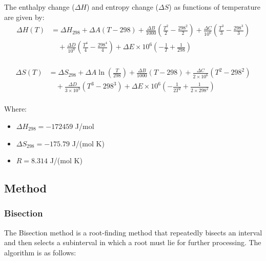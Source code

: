 \documentclass[10pt]{article}
\begin{document}
The enthalpy change (\( \Delta H \)) and entropy change (\( \Delta S \)) as functions of temperature are given by:
\begin{equation}
\begin{aligned}
\Delta H(T) &= \Delta H_{298} + \Delta A (T - 298) + \frac{\Delta B}{1000} \left( \frac{T^2}{2} - \frac{298^2}{2} \right) + \frac{\Delta C}{10^6} \left( \frac{T^3}{3} - \frac{298^3}{3} \right) \\
&\quad + \frac{\Delta D}{10^9} \left( \frac{T^4}{4} - \frac{298^4}{4} \right) + \Delta E \times 10^6 \left( -\frac{1}{T} + \frac{1}{298} \right) \\
\end{aligned}
\end{equation}

\begin{equation}
\begin{aligned}
\Delta S(T) &= \Delta S_{298} + \Delta A \ln \left( \frac{T}{298} \right) + \frac{\Delta B}{1000} (T - 298) + \frac{\Delta C}{2 \times 10^6} (T^2 - 298^2) \\
&\quad + \frac{\Delta D}{3 \times 10^9} (T^3 - 298^3) + \Delta E \times 10^6 \left( -\frac{1}{2T^2} + \frac{1}{2 \times 298^2} \right) \\
\end{aligned}
\end{equation}

Where:
\begin{itemize}
    \item \( \Delta H_{298} = -172459 \) J/mol
    \item \( \Delta S_{298} = -175.79 \) J/(mol K)
    \item \( R = 8.314 \) J/(mol K)
\end{itemize}

\newpage
\subsection{Method}
\subsubsection{Bisection}
The Bisection method is a root-finding method that repeatedly bisects an interval and then selects a subinterval in which a root must lie for further processing. The algorithm is as follows:
\end{document}
